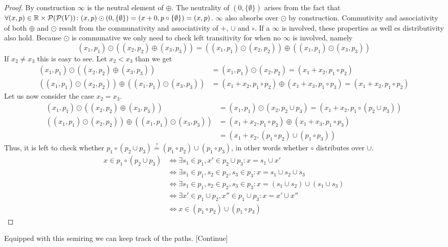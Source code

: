 \begin{proof}
    By construction $\infty$ is the neutral element of $\oplus$. The neutrality of $(0, \{\emptyset\})$ arises from the fact that $\forall (x, p) \in \mathbb{R} \times \mathcal{P}(\mathcal{P}(V))\colon (x, p) \odot (0, \{\emptyset\}) = (x + 0, p \circ \{\emptyset\}) = (x, p)$. $\infty$ also absorbs over $\odot$ by construction. Commutivity and associativity of both $\oplus$ and $\odot$ result from the communativity and associativity of $+$, $\cup$ and $\circ$. If a $\infty$ is involved, these properties as well es distributivity also hold. Because $\odot$ is communative we only need to check left transitivity for when no $\infty$ is involved, namely 
    $$(x_1, p_1) \odot ((x_2, p_2) \oplus (x_3, p_3)) = ((x_1, p_1) \odot (x_2, p_2)) \oplus ((x_1, p_1) \odot (x_3, p_3))$$
    If $x_2 \neq x_3$ this is easy to see. Let $x_2 < x_3$ than we get
    \begin{align*}
        (x_1, p_1) \odot ((x_2, p_2) \oplus (x_3, p_3)) &= (x_1, p_1) \odot (x_2, p_2) = (x_1 + x_2, p_1 \circ p_2)\\
        ((x_1, p_1) \odot (x_2, p_2)) \oplus ((x_1, p_1) \odot (x_3, p_3)) &= (x_1 + x_2, p_1 \circ p_2) \oplus (x_1 + x_3, p_1 \circ p_3) = (x_1 + x_2, p_1 \circ p_2)
    \end{align*}
    Let us now consider the case $x_2 = x_3$.
    \begin{align*}
        (x_1, p_1) \odot ((x_2, p_2) \oplus (x_3, p_3)) &= (x_1, p_1) \odot (x_2, p_2 \cup p_3) = (x_1 + x_2, p_1 \circ (p_2 \cup p_3))\\
        ((x_1, p_1) \odot (x_2, p_2)) \oplus ((x_1, p_1) \odot (x_3, p_3)) &= (x_1 + x_2, p_1 \circ p_2) \oplus (x_1 + x_3, p_1 \circ p_3)\\ 
        &= (x_1 + x_2, (p_1 \circ p_2) \cup (p_1 \circ p_3))
    \end{align*}
    Thus, it is left to check whether $p_1 \circ (p_2 \cup p_3) \stackrel{?}{=} (p_1 \circ p_2) \cup (p_1 \circ p_3)$, in other words whether $\circ$ distributes over $\cup$.
    \begin{align*}
        x \in p_1 \circ (p_2 \cup p_3) &\Leftrightarrow \exists s_1 \in p_1, x' \in p_2 \cup p_3\colon x = s_1 \cup x'\\
        &\Leftrightarrow \exists s_1\in p_1, s_2 \in p_2, s_3 \in p_3 \colon x = s_1 \cup s_2 \cup s_3\\
        &\Leftrightarrow \exists s_1\in p_1, s_2 \in p_2, s_3 \in p_3 \colon x = (s_1 \cup s_2) \cup (s_1 \cup s_3)\\
        &\Leftrightarrow \exists x' \in p_1 \cup p_2, x'' \in p_1 \cup p_3 \colon x = x' \cup x''\\
        &\Leftrightarrow x \in (p_1 \circ p_2) \cup (p_1 \circ p_3)
    \end{align*}
\end{proof}
Equipped with this semiring we can keep track of the paths. [Continue]

